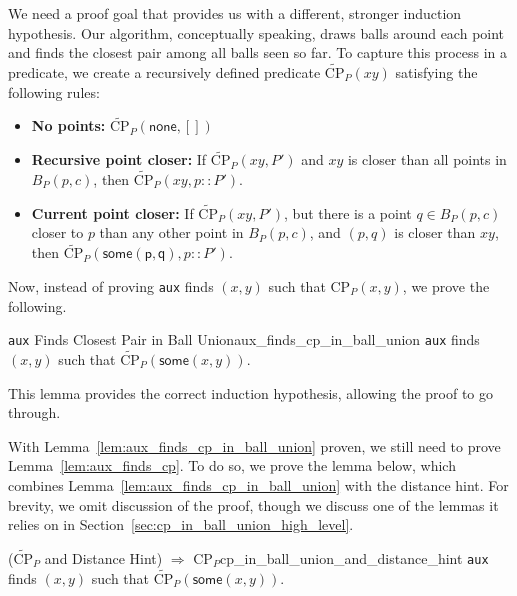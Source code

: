\documentclass{article}
\begin{document}
We need a proof goal that provides us with a different, stronger induction hypothesis.
Our algorithm, conceptually speaking, draws balls around each point and finds the closest pair among all balls seen so far.
To capture this process in a predicate, we create a recursively defined predicate $\widetilde{\text{CP}}_P(x\!y)$ satisfying the following rules:
\begin{itemize}
  \item \textbf{No points:} $\widetilde{\text{CP}}_P(\mathsf{none}, [])$
  \label{case:rec_pt_closer}
  \item \textbf{Recursive point closer:} If $\widetilde{\text{CP}}_P(x\!y, P')$ and $x\!y$ is closer than all points in $B_P(p, c)$, then $\widetilde{\text{CP}}_P(x\!y, p :: P')$.
  \label{case:curr_pt_closer}
  \item \textbf{Current point closer:} If $\widetilde{\text{CP}}_P(x\!y, P')$, but there is a point $q \in B_P(p, c)$ closer to $p$ than any other point in $B_P(p, c)$, and $(p, q)$ is closer than $x\!y$, then $\widetilde{\text{CP}}_P(\mathsf{some(p, q)}, p :: P')$.
\end{itemize}
Now, instead of proving \texttt{aux} finds $(x, y)$ such that $\text{CP}_P(x, y)$, we prove the following.

\begin{tcblemma}{{\large\texttt{aux}} Finds Closest Pair in Ball Union}{aux_finds_cp_in_ball_union}
\texttt{aux} finds $(x, y)$ such that $\widetilde{\text{CP}}_P(\mathsf{some}(x, y))$.
\end{tcblemma}
This lemma provides the correct induction hypothesis, allowing the proof to go through.

With Lemma~\ref{lem:aux_finds_cp_in_ball_union} proven, we still need to prove Lemma~\ref{lem:aux_finds_cp}.
To do so, we prove the lemma below, which combines Lemma~\ref{lem:aux_finds_cp_in_ball_union} with the distance hint.
For brevity, we omit discussion of the proof, though we discuss one of the lemmas it relies on in Section~\ref{sec:cp_in_ball_union_high_level}.

\begin{tcblemma}{($\widetilde{\text{CP}}_P$ and Distance Hint) $\Rightarrow$ $\text{CP}_P$}{cp_in_ball_union_and_distance_hint}
\texttt{aux} finds $(x, y)$ such that $\widetilde{\text{CP}}_P(\mathsf{some}(x, y))$.
\end{tcblemma}

\end{document}
